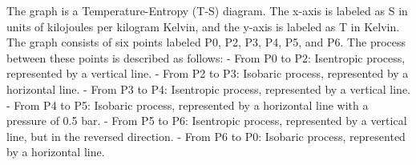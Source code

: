 The graph is a Temperature-Entropy (T-S) diagram. The x-axis is labeled as S in units of kilojoules per kilogram Kelvin, and the y-axis is labeled as T in Kelvin. The graph consists of six points labeled P0, P2, P3, P4, P5, and P6. The process between these points is described as follows:
- From P0 to P2: Isentropic process, represented by a vertical line.
- From P2 to P3: Isobaric process, represented by a horizontal line.
- From P3 to P4: Isentropic process, represented by a vertical line.
- From P4 to P5: Isobaric process, represented by a horizontal line with a pressure of 0.5 bar.
- From P5 to P6: Isentropic process, represented by a vertical line, but in the reversed direction.
- From P6 to P0: Isobaric process, represented by a horizontal line.